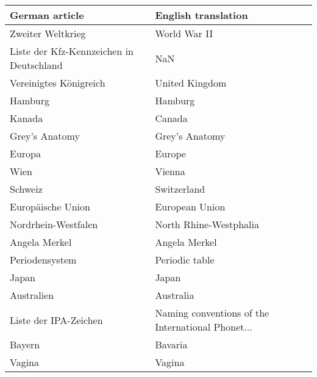 \begin{tabular}{ll}
\toprule
                           German article &                                English translation \\
\midrule
                        Zweiter Weltkrieg &                                       World War II \\
 Liste der Kfz-Kennzeichen in Deutschland &                                                NaN \\
                   Vereinigtes Königreich &                                     United Kingdom \\
                                  Hamburg &                                            Hamburg \\
                                   Kanada &                                             Canada \\
                           Grey’s Anatomy &                                     Grey's Anatomy \\
                                   Europa &                                             Europe \\
                                     Wien &                                             Vienna \\
                                  Schweiz &                                        Switzerland \\
                        Europäische Union &                                     European Union \\
                      Nordrhein-Westfalen &                             North Rhine-Westphalia \\
                            Angela Merkel &                                      Angela Merkel \\
                           Periodensystem &                                     Periodic table \\
                                    Japan &                                              Japan \\
                               Australien &                                          Australia \\
                    Liste der IPA-Zeichen &  Naming conventions of the International Phonet... \\
                                   Bayern &                                            Bavaria \\
                                   Vagina &                                             Vagina \\

\end{tabular}
